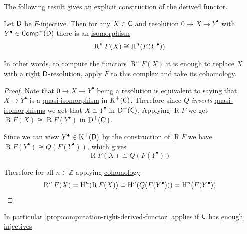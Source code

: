 \documentclass[../../main]{subfiles}
\begin{document}
The following result gives an explicit construction of the \hyperref[def:right-derived-functor]{derived functor}.
\begin{proposition}\label{prop:computation-right-derived-functor}
  Let \(\category{D}\) be \hyperref[def:F-injective-subcategory]{\(F\)-injective}.
  Then for any \(X \in \category{C}\) and resolution \(0 \to X \to Y^{\bullet}\) with \(Y^{\bullet} \in \Complex[+]{\category{D}}\) there is an \hyperref[def:categorical-isomorphism]{isomorphism}
  \begin{equation*}
    \operatorname{R}^{n}F(X) \cong \cohomology{n}(F(Y^{\bullet}))
  \end{equation*}

  In other words, to compute the \hyperref[def:functor]{functors} \(\operatorname{R}^{n}F(X)\) it is enough to replace \(X\) with a right \(\category{D}\)-resolution, apply \(F\) to this complex and take its \hyperref[def:cohomology]{cohomology}.
\end{proposition}
\begin{proof}
  Note that \(0 \to X \to Y^{\bullet}\) being a resolution is equivalent to saying that \(X \to Y^{\bullet}\) is a \hyperref[def:quasi-isormophism]{quasi-isomorphism} in \(\operatorname{K}^{+}(\category{C})\).
  Therefore since \(Q\) \textit{inverts} \hyperref[def:quasi-isormophism]{quasi-isomorphisms} we get that \(X \cong Y^{\bullet}\) in \(\operatorname{D}^{+}(\category{C})\).
  Applying \(\operatorname{R}F\) we get \(\operatorname{R}F(X) \cong \operatorname{R}F(Y^{\bullet})\) in \(\operatorname{D}^{+}(\category{C'})\).

  Since we can view \(Y^{\bullet} \in \operatorname{K}^{+}(\category{D})\) by the \hyperref[rem:right-derived-functor-construction]{construction of \(\operatorname{R}F\)} we have \(\operatorname{R}F(Y^{\bullet}) \cong Q(F(Y^{\bullet}))\), which gives
  \begin{equation*}
    \operatorname{R}F(X) \cong Q(F(Y^{\bullet}))
  \end{equation*}

  Therefore for all \(n \in \mathbb{Z}\) applying \hyperref[def:cohomology]{cohomology}
  \begin{equation*}
    \operatorname{R}^{n}F(X) = \cohomology{n}(\operatorname{R}F(X)) \cong \cohomology{n}(Q(F(Y^{\bullet}))) = \cohomology{n}(F(Y^{\bullet}))
  \end{equation*}
\end{proof}

\begin{remark}
  In particular \autoref{prop:computation-right-derived-functor} applies if \(\category{C}\) has \hyperref[def:enough-injective-projectives]{enough injectives}.
\end{remark}
\end{document}
